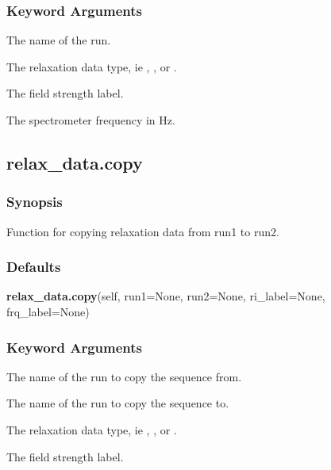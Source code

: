   
 \subsubsection{Keyword Arguments} 

   The name of the run.   

   The relaxation data type, ie , , or .   

   The field strength label.   

   The spectrometer frequency in Hz.  

  

  

 \newpage 

 \subsection{relax\_data.copy} 

  
 \subsubsection{Synopsis} 

 Function for copying relaxation data from run1 to run2. 
  

  
 \subsubsection{Defaults} 

 \textsf{\textbf{relax\_data.copy}(self, run1=None, run2=None, ri\_label=None, frq\_label=None)} 

  
 \subsubsection{Keyword Arguments} 

   The name of the run to copy the sequence from.   

   The name of the run to copy the sequence to.   

   The relaxation data type, ie , , or .   

   The field strength label.  

  


